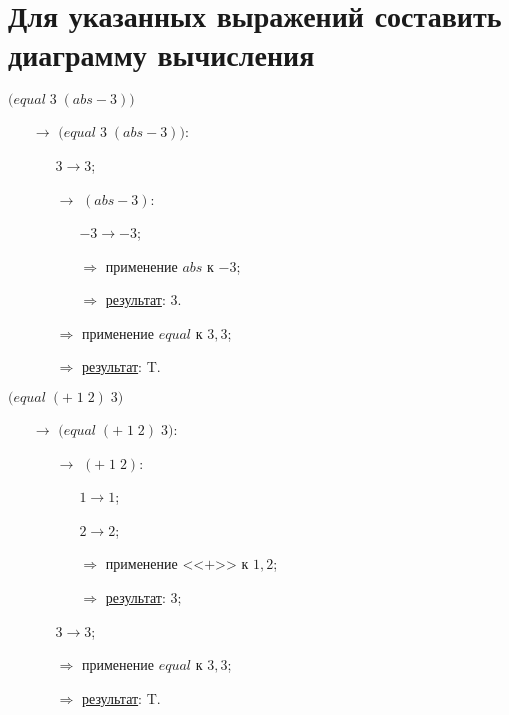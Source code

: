 
\section{Для указанных выражений составить диаграмму вычисления}

\vfill
\problem $\bigl(equal\; 3\; (abs -\!3)\bigr)$

\begin{itemize}
	\item[$\longrightarrow$]$\bigl(equal\; 3\; (abs -\!3)\bigr)$:
	\begin{itemize}
		\item[\textbullet] $3 \to 3$;
		\item[$\longrightarrow$] $(abs -\!3)$:
		\begin{itemize}
			\item[\textbullet] $-3 \to -3$;
			\item[$\Longrightarrow$] применение $abs$ к $-3$;
			\item[$\Longrightarrow$] \underline{результат}: $3$.
		\end{itemize}
		\item[$\Longrightarrow$] применение $equal$ к $3, 3$;
		\item[$\Longrightarrow$] \underline{результат}: T.
	\end{itemize}
\end{itemize}
\vfill


\problem $\bigl(equal\; (+\; 1\; 2)\; 3\bigr)$

\begin{itemize}
	\item[$\longrightarrow$] $\bigl(equal\; (+\; 1\; 2)\; 3\bigr)$:
	\begin{itemize}
		\item[$\longrightarrow$] $(+\; 1\; 2)$:
		\begin{itemize}
			\item[\textbullet] $1 \to 1$;
			\item[\textbullet] $2 \to 2$;
			\item[$\Longrightarrow$] применение <<$+$>> к $1, 2$;
			\item[$\Longrightarrow$] \underline{результат}: $3$;
		\end{itemize}
		\item[\textbullet] $3 \to 3$;
		\item[$\Longrightarrow$] применение $equal$ к $3, 3$;
		\item[$\Longrightarrow$] \underline{результат}: T.
	\end{itemize}
\end{itemize}
\vfill


